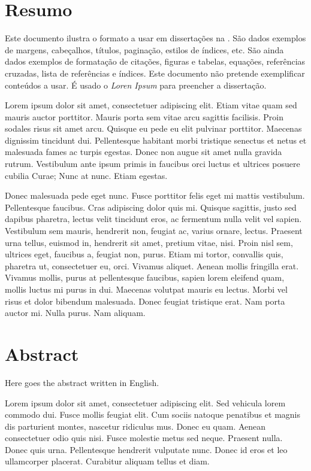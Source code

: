 \chapter*{Resumo}

Este documento ilustra o formato a usar em dissertações na \Feup.
São dados exemplos de margens, cabeçalhos, títulos, paginação, estilos
de índices, etc. 
São ainda dados exemplos de formatação de citações, figuras e tabelas,
equações, referências cruzadas, lista de referências e índices.
Este documento não pretende exemplificar conteúdos a usar. 
É usado o \emph{Loren Ipsum} para preencher a dissertação.

Lorem ipsum dolor sit amet, consectetuer adipiscing elit. Etiam vitae
quam sed mauris auctor porttitor. Mauris porta sem vitae arcu sagittis
facilisis. Proin sodales risus sit amet arcu. Quisque eu pede eu elit
pulvinar porttitor. Maecenas dignissim tincidunt dui. Pellentesque
habitant morbi tristique senectus et netus et malesuada fames ac
turpis egestas. Donec non augue sit amet nulla gravida
rutrum. Vestibulum ante ipsum primis in faucibus orci luctus et
ultrices posuere cubilia Curae; Nunc at nunc. Etiam egestas. 

Donec malesuada pede eget nunc. Fusce porttitor felis eget mi mattis
vestibulum. Pellentesque faucibus. Cras adipiscing dolor quis
mi. Quisque sagittis, justo sed dapibus pharetra, lectus velit
tincidunt eros, ac fermentum nulla velit vel sapien. Vestibulum sem
mauris, hendrerit non, feugiat ac, varius ornare, lectus. Praesent
urna tellus, euismod in, hendrerit sit amet, pretium vitae,
nisi. Proin nisl sem, ultrices eget, faucibus a, feugiat non,
purus. Etiam mi tortor, convallis quis, pharetra ut, consectetuer eu,
orci. Vivamus aliquet. Aenean mollis fringilla erat. Vivamus mollis,
purus at pellentesque faucibus, sapien lorem eleifend quam, mollis
luctus mi purus in dui. Maecenas volutpat mauris eu lectus. Morbi vel
risus et dolor bibendum malesuada. Donec feugiat tristique erat. Nam
porta auctor mi. Nulla purus. Nam aliquam. 

\chapter*{Abstract}

Here goes the abstract written in English.

Lorem ipsum dolor sit amet, consectetuer adipiscing elit. Sed vehicula
lorem commodo dui. Fusce mollis feugiat elit. Cum sociis natoque
penatibus et magnis dis parturient montes, nascetur ridiculus
mus. Donec eu quam. Aenean consectetuer odio quis nisi. Fusce molestie
metus sed neque. Praesent nulla. Donec quis urna. Pellentesque
hendrerit vulputate nunc. Donec id eros et leo ullamcorper
placerat. Curabitur aliquam tellus et diam. 

